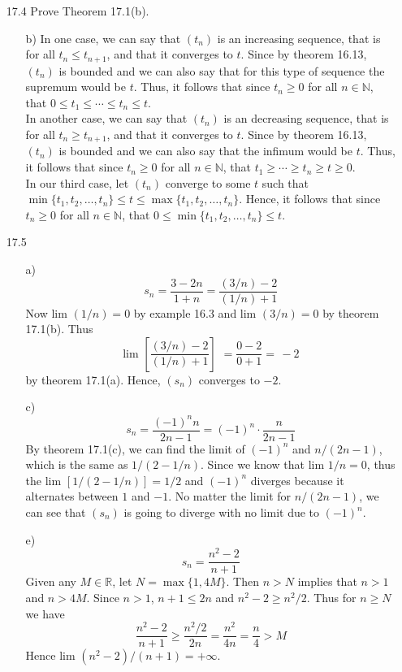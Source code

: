 \documentclass[12pt]{article}
\begin{document}
\begin{enumerate}
\begin{enumerate}
\item[17.4] Prove Theorem 17.1(b).
\begin{enumerate}
\item[b)] In one case, we can say that $(t_n)$ is an increasing sequence, that is for all
$t_n \leq t_{n+1}$, and that it converges to $t$. Since by theorem 16.13, $(t_n)$ is bounded
and we can also say that for this type of sequence the supremum would be $t$. 
Thus, it follows that since $t_n \geq 0$
for all $n \in \mathbb{N}$, that $0 \leq t_1 \leq \cdots \leq t_n \leq t$. \\
In another case, we can say that $(t_n)$ is an decreasing sequence, that is for all
$t_n \geq t_{n+1}$, and that it converges to $t$. Since by theorem 16.13, $(t_n)$ is bounded
and we can also say that the infimum would be $t$. Thus, it follows that since $t_n \geq 0$
for all $n \in \mathbb{N}$, that $t_1 \geq \cdots \geq t_n \geq t \geq 0$. \\
In our third case, let $(t_n)$ converge to some $t$ such that \\
$\min\{t_1, t_2, \ldots, t_n\} \leq t \leq \max\{t_1, t_2, \ldots, t_n\}$. Hence,
it follows that since $t_n \geq 0$ for all $n \in \mathbb{N}$, that 
$0 \leq \min\{t_1, t_2, \ldots, t_n\} \leq t$.
\end{enumerate}

\item[17.5] 
\begin{enumerate}
\item[a)] 
\[
s_n = \frac{3 - 2n}{1 + n} = \frac{(3/n) - 2}{(1/n) + 1}
\]
Now lim $(1/n) = 0$ by example 16.3 and lim $(3/n) = 0$ by theorem 17.1(b). Thus
\[
\mbox{lim } \left[ \frac{(3/n) - 2}{(1/n) + 1} \right]
\,\, = \frac{0 - 2}{0 + 1} = \,-2
\]
by theorem 17.1(a). Hence, $(s_n)$ converges to $-2$.

\item[c)] 
\[ 
s_n = \frac{(-1)^nn}{2n - 1} = (-1)^n \cdot \frac{n}{2n - 1}
\]
By theorem 17.1(c), we can find the limit of $(-1)^n$ and $n/(2n - 1)$, which is the same as 
$1/(2 - 1/n)$. Since we know that lim $1/n = 0$, thus the lim $[1/(2 - 1/n)] = 1/2$ and
$(-1)^n$ diverges because it alternates between $1$ and $-1$. No matter the
limit for $n/(2n - 1)$, we can see that $(s_n)$ is going to diverge with no limit due to
$(-1)^n$.

\item[e)] 
\[
s_n = \frac{n^2 - 2}{n + 1}
\]
Given any $M \in \mathbb{R}$, let $N = \max\{1, 4M\}$. Then $n > N$ implies that
$n > 1$ and $n > 4M$. Since $n > 1$, $n + 1 \leq 2n$ and $n^2 - 2 \geq n^2/2$.
Thus for $n \geq N$ we have
\[
\frac{n^2 - 2}{n + 1} \geq \frac{n^2/2}{2n} = \frac{n^2}{4n} = \frac{n}{4} > M
\]
Hence lim $(n^2 - 2)/(n + 1) = +\infty$.


\end{enumerate}
\end{enumerate}
\end{enumerate}
\end{document}
